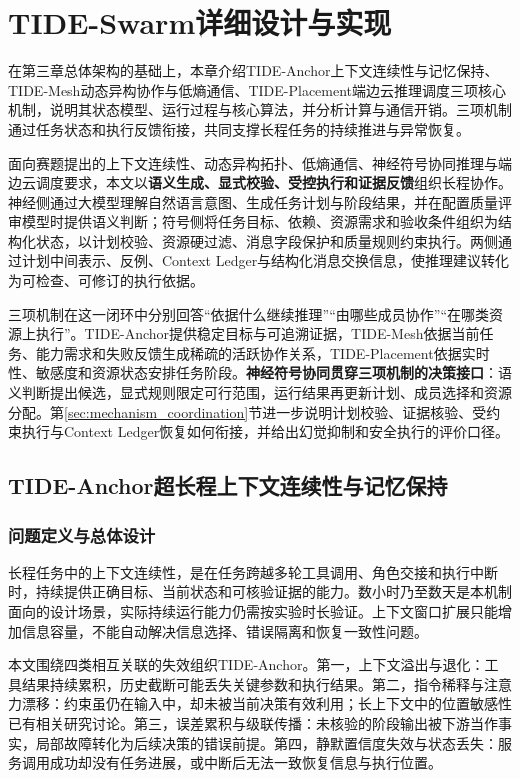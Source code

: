 \chapter{TIDE-Swarm详细设计与实现}
在第三章总体架构的基础上，本章介绍TIDE-Anchor上下文连续性与记忆保持、TIDE-Mesh动态异构协作与低熵通信、TIDE-Placement端边云推理调度三项核心机制，说明其状态模型、运行过程与核心算法，并分析计算与通信开销。三项机制通过任务状态和执行反馈衔接，共同支撑长程任务的持续推进与异常恢复。

面向赛题提出的上下文连续性、动态异构拓扑、低熵通信、神经符号协同推理与端边云调度要求，本文以\textbf{语义生成、显式校验、受控执行和证据反馈}组织长程协作。神经侧通过大模型理解自然语言意图、生成任务计划与阶段结果，并在配置质量评审模型时提供语义判断；符号侧将任务目标、依赖、资源需求和验收条件组织为结构化状态，以计划校验、资源硬过滤、消息字段保护和质量规则约束执行。两侧通过计划中间表示、反例、Context Ledger与结构化消息交换信息，使推理建议转化为可检查、可修订的执行依据。

三项机制在这一闭环中分别回答“依据什么继续推理”“由哪些成员协作”“在哪类资源上执行”。TIDE-Anchor提供稳定目标与可追溯证据，TIDE-Mesh依据当前任务、能力需求和失败反馈生成稀疏的活跃协作关系，TIDE-Placement依据实时性、敏感度和资源状态安排任务阶段。\textbf{神经符号协同贯穿三项机制的决策接口}：语义判断提出候选，显式规则限定可行范围，运行结果再更新计划、成员选择和资源分配。第\ref{sec:mechanism_coordination}节进一步说明计划校验、证据核验、受约束执行与Context Ledger恢复如何衔接，并给出幻觉抑制和安全执行的评价口径。


\section{TIDE-Anchor超长程上下文连续性与记忆保持}
\label{sec:tide_anchor}

\subsection{问题定义与总体设计}

长程任务中的上下文连续性，是在任务跨越多轮工具调用、角色交接和执行中断时，持续提供正确目标、当前状态和可核验证据的能力。数小时乃至数天是本机制面向的设计场景，实际持续运行能力仍需按实验时长验证。上下文窗口扩展只能增加信息容量，不能自动解决信息选择、错误隔离和恢复一致性问题。

本文围绕四类相互关联的失效组织TIDE-Anchor。第一，上下文溢出与退化：工具结果持续累积，历史截断可能丢失关键参数和执行结果。第二，指令稀释与注意力漂移：约束虽仍在输入中，却未被当前决策有效利用；长上下文中的位置敏感性已有相关研究讨论\cite{tide_lost_middle}。第三，误差累积与级联传播：未核验的阶段输出被下游当作事实，局部故障转化为后续决策的错误前提。第四，静默置信度失效与状态丢失：服务调用成功却没有任务进展，或中断后无法一致恢复信息与执行位置。

